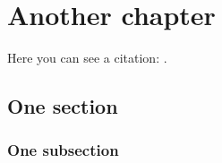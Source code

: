 \chapter{Another chapter}
Here you can see a citation: \cite{debiePerformanceSevenECG2020}.

\lipsum[7]

\section{One section}

\lipsum[3]

\subsection{One subsection}

\lipsum[3]

